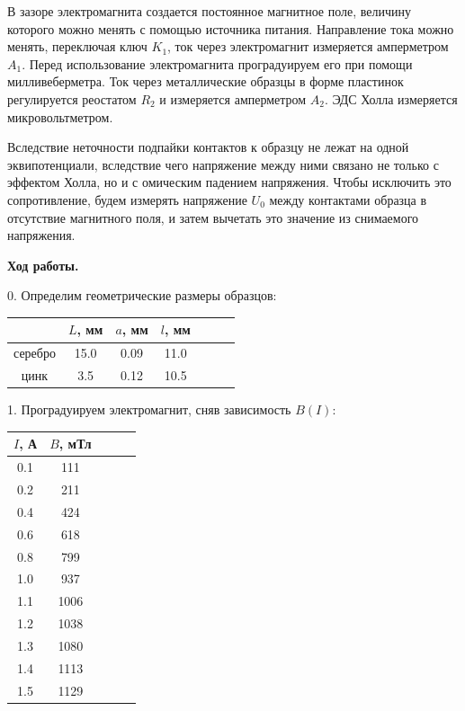 \documentclass[14pt]{article}
\begin{document}
В зазоре электромагнита создается постоянное магнитное поле, величину которого можно менять с помощью источника питания. Направление тока можно менять, переключая ключ $K_1$, ток через электромагнит измеряется амперметром $A_1$. Перед использование электромагнита проградуируем его при помощи милливеберметра. Ток через металлические образцы в форме пластинок регулируется реостатом $R_2$ и измеряется амперметром $A_2$. ЭДС Холла измеряется микровольтметром.

Вследствие неточности подпайки контактов к образцу не лежат на одной эквипотенциали, вследствие чего напряжение между ними связано не только с эффектом Холла, но и с омическим падением напряжения. Чтобы исключить это сопротивление, будем измерять напряжение $U_0$ между контактами образца в отсутствие магнитного поля, и затем вычетать это значение из снимаемого напряжения. 

\vspace{1cm}
\textbf{Ход работы.}

0. Определим геометрические размеры образцов:

\begin{center}
\begin{tabular}{|c|c|c|c|c|c|c|}
\hline
			&	$L$, мм		&	$a$, мм		&	$l$, мм		\\
\hline
серебро		&	15.0		&	0.09		&	11.0		\\
\hline
цинк		&	3.5			&	0.12		&	10.5		\\
\hline
\end{tabular}
\end{center}

1. Проградуируем электромагнит, сняв зависимость $B(I)$:

\begin{center}
\begin{tabular}{|c|c|c|c|c|}
\hline
$I$, А		&		$B$, мТл	\\
\hline
0.1			&		111			\\
\hline
0.2			&		211			\\
\hline
0.4			&		424			\\
\hline
0.6			&		618			\\
\hline
0.8			&		799			\\
\hline
1.0			&		937			\\
\hline
1.1			&		1006		\\
\hline
1.2			&		1038		\\
\hline
1.3			&		1080		\\
\hline
1.4			&		1113		\\
\hline
1.5			&		1129		\\
\hline
\end{tabular}
\end{center}
\end{document}
